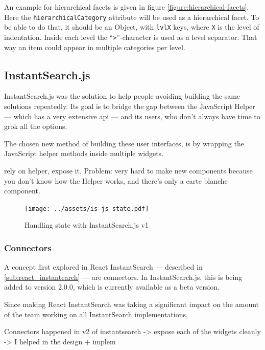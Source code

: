 An example for hierarchical facets is given in figure \ref{figure:hierarchical-facets}. Here the {\tt hierarchicalCategory} \gls{attribute} will be used as a hierarchical facet. To be able to do that, it should be an Object, with {\tt lvlX} keys, where {\tt X} is the level of indentation. Inside each level the ``{\tt >}''-character is used as a level separator. That way an item could appear in multiple categories per level.


\subsection{InstantSearch.js} %
\label{sub:instantsearch_js}

InstantSearch.js was the solution to help people avoiding building the same solutions repeatedly. Its goal is to bridge the gap between the JavaScript Helper --- which has a very extensive \acrshort{api} --- and its users, who don't always have time to grok all the options.

The chosen new method of building these user interfaces, is by wrapping the JavaScript helper methods inside multiple widgets. %

rely on helper, expose it. Problem: very hard to make new components because you don't know how the Helper works, and there's only a carte blanche component. %

\begin{figure}[H]
  \centering
  \texttt{[image: ../assets/is-js-state.pdf]}
  \caption{Handling state with InstantSearch.js v1}
  \label{figure:is-js-state}
\end{figure} %

\subsubsection{Connectors} %
\label{ssub:instantsearch_js_connectors}

A concept first explored in React InstantSearch --- described in \ref{sub:react_instantearch} --- are connectors. In InstantSearch.js, this is being added to version 2.0.0, which is currently available as a beta version. 

Since making React InstantSearch was taking a significant impact on the amount of the team working on all InstantSearch implementations, %

Connectors happened in v2 of instantsearch
-> expose each of the widgets cleanly
-> I helped in the design + implem %

